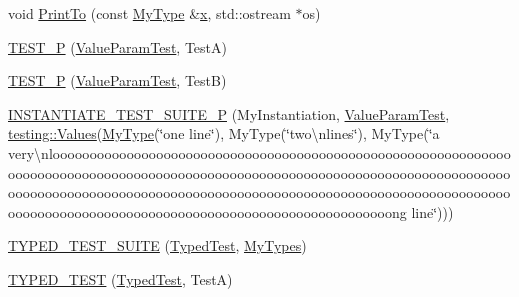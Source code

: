 \begin{DoxyCompactItemize}
\item 
void \mbox{\hyperlink{_obj__test_2lib_2googletest-master_2googletest_2test_2googletest-list-tests-unittest___8cc_aaf76f8f336db1c295fe3aa914c4c6182}{Print\+To}} (const \mbox{\hyperlink{class_my_type}{My\+Type}} \&\mbox{\hyperlink{_obj__test_2lib_2googletest-master_2googlemock_2test_2gmock-matchers__test_8cc_a6150e0515f7202e2fb518f7206ed97dc}{x}}, std\+::ostream $\ast$os)
\item 
\mbox{\hyperlink{_obj__test_2lib_2googletest-master_2googletest_2test_2googletest-list-tests-unittest___8cc_adc97fba291db78177b4e5bdf6f6d9018}{T\+E\+S\+T\+\_\+P}} (\mbox{\hyperlink{class_value_param_test}{Value\+Param\+Test}}, TestA)
\item 
\mbox{\hyperlink{_obj__test_2lib_2googletest-master_2googletest_2test_2googletest-list-tests-unittest___8cc_aa743157309ca6126251b87f7436205a1}{T\+E\+S\+T\+\_\+P}} (\mbox{\hyperlink{class_value_param_test}{Value\+Param\+Test}}, TestB)
\item 
\mbox{\hyperlink{_obj__test_2lib_2googletest-master_2googletest_2test_2googletest-list-tests-unittest___8cc_ac2b79a5b6af77ea7410b124b0904ddd4}{I\+N\+S\+T\+A\+N\+T\+I\+A\+T\+E\+\_\+\+T\+E\+S\+T\+\_\+\+S\+U\+I\+T\+E\+\_\+P}} (My\+Instantiation, \mbox{\hyperlink{class_value_param_test}{Value\+Param\+Test}}, \mbox{\hyperlink{namespacetesting_abd3c87b40c2a0663691c9b617ed5fcc2}{testing\+::\+Values}}(\mbox{\hyperlink{class_my_type}{My\+Type}}(\char`\"{}one line\char`\"{}), My\+Type(\char`\"{}two\textbackslash{}nlines\char`\"{}), My\+Type(\char`\"{}a very\textbackslash{}nloooooooooooooooooooooooooooooooooooooooooooooooooooooooooooooooooooooooooooooooooooooooooooooooooooooooooooooooooooooooooooooooooooooooooooooooooooooooooooooooooooooooooooooooooooooooooooooooooooooooooooooooooooooooooooooooooooooooooooooooooooooooooong line\char`\"{})))
\item 
\mbox{\hyperlink{_obj__test_2lib_2googletest-master_2googletest_2test_2googletest-list-tests-unittest___8cc_a346de8e681bc95011fed254a54e30205}{T\+Y\+P\+E\+D\+\_\+\+T\+E\+S\+T\+\_\+\+S\+U\+I\+TE}} (\mbox{\hyperlink{class_typed_test}{Typed\+Test}}, \mbox{\hyperlink{googletest-master_2googletest_2test_2googletest-list-tests-unittest___8cc_a16f58cd49c18568802322bbaf9f3f654}{My\+Types}})
\item 
\mbox{\hyperlink{_obj__test_2lib_2googletest-master_2googletest_2test_2googletest-list-tests-unittest___8cc_a83ec84c5fac9fdffa59a16e5d043bd66}{T\+Y\+P\+E\+D\+\_\+\+T\+E\+ST}} (\mbox{\hyperlink{class_typed_test}{Typed\+Test}}, TestA)
\item 

\end{DoxyCompactItemize}
